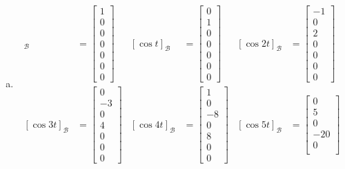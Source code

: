 \documentclass[11pt]{scrartcl}
\theoremstyle{dotlessP}
\theoremstyle{dotlessN}
\newcommand{\basis}{\mathcal{B}}
\begin{document}
\begin{enumerate}[a)]
	\item 
		\begin{align*}
			[1]_\basis &=
\begin{bmatrix}
	1 \\
	0 \\
	0 \\
	0 \\
	0 \\
	0 \\
	0 
\end{bmatrix} &
			[\cos t]_\basis &= 
\begin{bmatrix}
	0 \\
	1 \\
	0 \\
	0 \\
	0 \\
	0 \\
	0
\end{bmatrix}
							&
			[\cos 2t]_\basis &= 
\begin{bmatrix}
	-1 \\
	0 \\
	2 \\
	0 \\
	0 \\
	0 \\
	0
\end{bmatrix}
			\\
			[\cos 3t]_\basis &=
\begin{bmatrix}
	0 \\
	-3 \\
	0 \\
	4 \\
	0 \\
	0 \\
	0
\end{bmatrix}
							 &
			[\cos 4t]_\basis &= 
\begin{bmatrix}
	1 \\
	0 \\
	-8 \\
	0 \\
	8 \\
	0 \\
	0
\end{bmatrix}
							 &
			[\cos 5t]_\basis &= 
\begin{bmatrix}
	0 \\
	5 \\
	0 \\
	-20 \\
	0 \\

\end{bmatrix}
\end{align*}
\end{enumerate}
\end{document}
